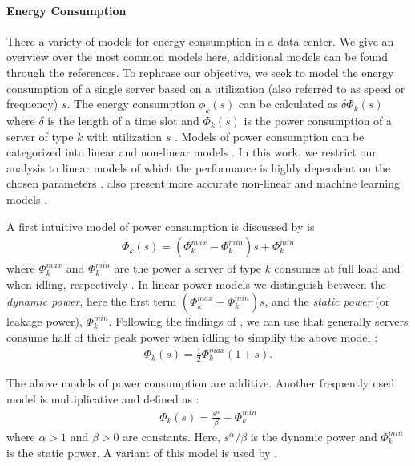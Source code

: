 \paragraph{Energy Consumption} There a variety of models for energy consumption in a data center. We give an overview over the most common models here, additional models can be found through the references. To rephrase our objective, we seek to model the energy consumption of a single server based on a utilization (also referred to as speed or frequency) $s$. The energy consumption $\phi_k(s)$ can be calculated as $\delta \Phi_k(s)$ where $\delta$ is the length of a time slot and $\Phi_k(s)$ is the power consumption of a server of type $k$ with utilization $s$ \cite{Dayarathna2016}. Models of power consumption can be categorized into linear and non-linear models \cite{Ismail2020}. In this work, we restrict our analysis to linear models of which the performance is highly dependent on the chosen parameters \cite{Ismail2020}. \citeauthor*{Ismail2020} also present more accurate non-linear and machine learning models \cite{Ismail2020}.

A first intuitive model of power consumption is discussed by \citeauthor*{Dayarathna2016, Ismail2020} is \begin{align*}
    \Phi_k(s) = (\Phi_k^{max} - \Phi_k^{min})s + \Phi_k^{min}
\end{align*} where $\Phi_k^{max}$ and $\Phi_k^{min}$ are the power a server of type $k$ consumes at full load and when idling, respectively \cite{Dayarathna2016, Ismail2020}. In linear power models we distinguish between the \textit{dynamic power}, here the first term $(\Phi_k^{max} - \Phi_k^{min})s$, and the \textit{static power} (or leakage power), $\Phi_k^{min}$. Following the findings of \citeauthor*{Barroso2007}, we can use that generally servers consume half of their peak power when idling to simplify the above model \cite{Barroso2007, Ismail2020}: \begin{align*}
    \Phi_k(s) = \frac{1}{2} \Phi_k^{max} (1 + s).
\end{align*}

The above models of power consumption are additive. Another frequently used model is multiplicative and defined as \cite{Dayarathna2016}: \begin{align*}
    \Phi_k(s) = \frac{s^{\alpha}}{\beta} + \Phi_k^{min}
\end{align*} where $\alpha > 1$ and $\beta > 0$ are constants. Here, $s^{\alpha}/\beta$ is the dynamic power and $\Phi_k^{min}$ is the static power. A variant of this model is used by \citeauthor*{Bansal2015} \cite{Bansal2015}.

